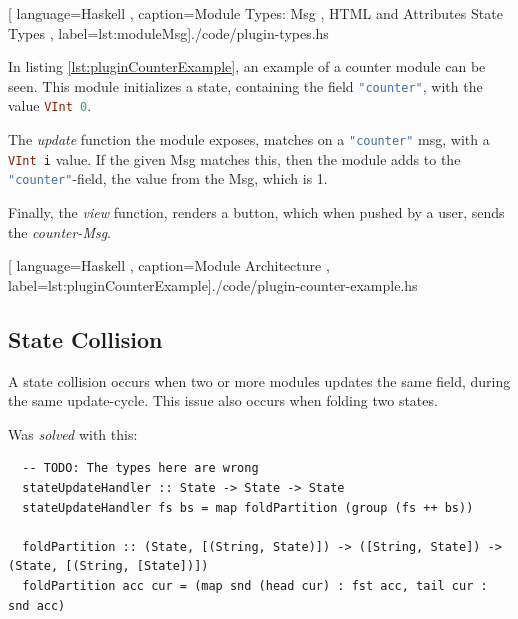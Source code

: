 \begin{center}
  \centering
  
    [ language=Haskell
    , caption={Module Types: Msg
    , HTML and Attributes State Types}
    , label=lst:moduleMsg]{./code/plugin-types.hs}
\end{center}

In listing \ref{lst:pluginCounterExample}, an example of a counter module can be
seen. This module initializes a state, containing the field
\lstinline[language=Haskell]{"counter"}, with the value
\lstinline[language=Haskell]{VInt 0}.

The \textit{update} function the module exposes, matches on a
\lstinline[language=Haskell]{"counter"} msg, with a
\lstinline[language=Haskell]{VInt i} value. If the given Msg matches this, then
the module adds to the \lstinline[language=Haskell]{"counter"}-field, the value
from the Msg, which is 1.

Finally, the \textit{view} function, renders a button, which when pushed by a
user, sends the \textit{counter-Msg}.

\begin{center}
  
    [ language=Haskell
    , caption={Module Architecture}
    , label=lst:pluginCounterExample]{./code/plugin-counter-example.hs}
\end{center}

\subsection{State Collision}

A state collision occurs when two or more modules updates the same field, during
the same update-cycle. This issue also occurs when folding two states.

Was \textit{solved} with this:

\begin{verbatim}
  -- TODO: The types here are wrong
  stateUpdateHandler :: State -> State -> State
  stateUpdateHandler fs bs = map foldPartition (group (fs ++ bs))

  foldPartition :: (State, [(String, State)]) -> ([String, State]) -> (State, [(String, [State])])
  foldPartition acc cur = (map snd (head cur) : fst acc, tail cur : snd acc)
\end{verbatim}


